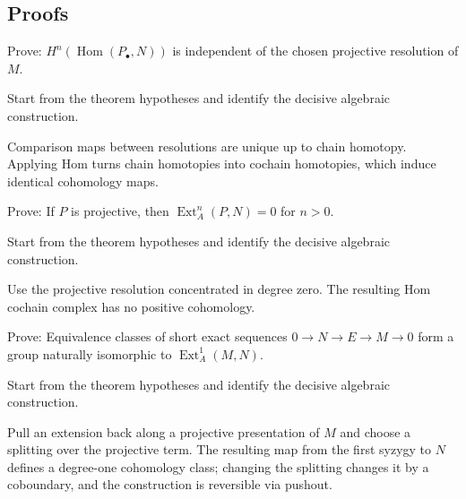 \subsection*{Proofs}

\begin{exercise}\label{exr:v27-expand-06}
Prove: $H^n(\operatorname{Hom}(P_\bullet,N))$ is independent of the chosen projective resolution of $M$.
\end{exercise}
\begin{hint}
Start from the theorem hypotheses and identify the decisive algebraic construction.
\end{hint}
\begin{solution}
Comparison maps between resolutions are unique up to chain homotopy. Applying Hom turns chain homotopies into cochain homotopies, which induce identical cohomology maps.
\end{solution}

\begin{exercise}\label{exr:v27-expand-07}
Prove: If $P$ is projective, then $\operatorname{Ext}_A^n(P,N)=0$ for $n>0$.
\end{exercise}
\begin{hint}
Start from the theorem hypotheses and identify the decisive algebraic construction.
\end{hint}
\begin{solution}
Use the projective resolution concentrated in degree zero. The resulting Hom cochain complex has no positive cohomology.
\end{solution}

\begin{exercise}\label{exr:v27-expand-08}
Prove: Equivalence classes of short exact sequences $0\to N\to E\to M\to0$ form a group naturally isomorphic to $\operatorname{Ext}_A^1(M,N)$.
\end{exercise}
\begin{hint}
Start from the theorem hypotheses and identify the decisive algebraic construction.
\end{hint}
\begin{solution}
Pull an extension back along a projective presentation of $M$ and choose a splitting over the projective term. The resulting map from the first syzygy to $N$ defines a degree-one cohomology class; changing the splitting changes it by a coboundary, and the construction is reversible via pushout.
\end{solution}

